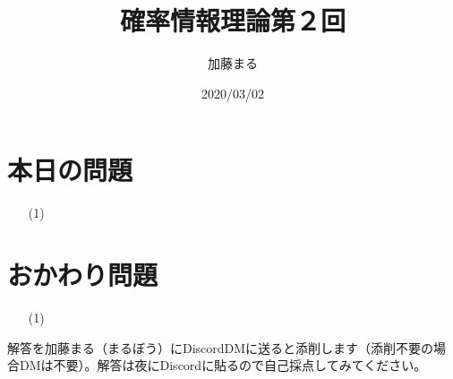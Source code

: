\documentclass[a4j,uplatex]{jsarticle}
\title{確率情報理論第２回}
\author{加藤まる}
\date{2020/03/02}
\begin{document}
\maketitle

\section*{本日の問題}
\begin{itemize}
  \item[(1)]
\end{itemize}

\section*{おかわり問題}
\begin{itemize}
  \item[(1)]
\end{itemize}

解答を加藤まる（まるぼう）にDiscordDMに送ると添削します（添削不要の場合DMは不要）。解答は夜にDiscordに貼るので自己採点してみてください。
\end{document}
